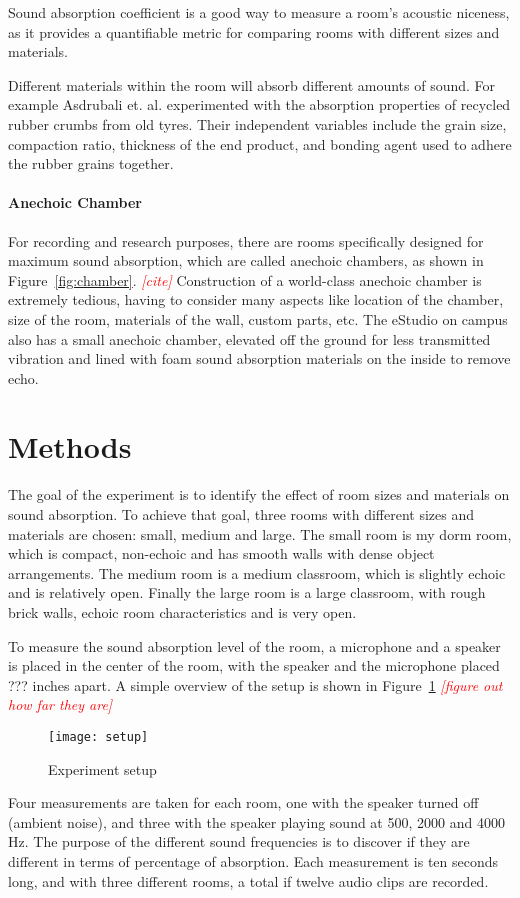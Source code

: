 \documentclass[12pt,onecolumn,letterpaper,draftclsnofoot]{article}
\newcommand{\todo}[1]{\textcolor{red}{{\em [#1]}} }
\newcommand{\figref}[1]{Figure~\ref{fig:#1}}
\begin{document}
Sound absorption coefficient is a good way to measure a room's acoustic
niceness, as it provides a quantifiable metric for comparing rooms with
different sizes and materials.

Different materials within the room will absorb different amounts of sound.
For example Asdrubali et. al. experimented with the absorption properties of
recycled rubber crumbs from old tyres. Their independent variables include the
grain size, compaction ratio, thickness of the end product, and bonding agent
used to adhere the rubber grains together. 

\paragraph{Anechoic Chamber}
For recording and research purposes, there are rooms specifically designed for
maximum sound absorption, which are called anechoic chambers, as shown in
\figref{chamber}. \todo{cite} Construction of a world-class anechoic chamber
is extremely tedious, having to consider many aspects like location of the
chamber, size of the room, materials of the wall, custom parts, etc. The
eStudio on campus also has a small anechoic chamber, elevated off the ground
for less transmitted vibration and lined with foam sound absorption materials
on the inside to remove echo.

\section{Methods}
The goal of the experiment is to identify the effect of room sizes and
materials on sound absorption. To achieve that goal, three rooms with
different sizes and materials are chosen: small, medium and large. The small
room is my dorm room, which is compact, non-echoic and has smooth walls with
dense object arrangements. The medium room is a medium classroom, which is
slightly echoic and is relatively open. Finally the large room is a large
classroom, with rough brick walls, echoic room characteristics and is very
open.

To measure the sound absorption level of the room, a microphone and a speaker
is placed in the center of the room, with the speaker and the microphone
placed ??? inches apart. A simple overview of the setup is shown in
\figref{setup} \todo{figure out how far they are} 
%
\begin{figure}
  \centering
  \texttt{[image: setup]}
  \caption{Experiment setup}
  \label{fig:setup}
\end{figure}
%
Four measurements are taken for each room, one with the speaker turned off
(ambient noise), and three with the speaker playing sound at 500, 2000 and
4000 Hz. The purpose of the different sound frequencies is to discover if they
are different in terms of percentage of absorption. Each measurement is ten 
seconds long, and with three different rooms, a total if twelve audio clips
are recorded.
\end{document}
